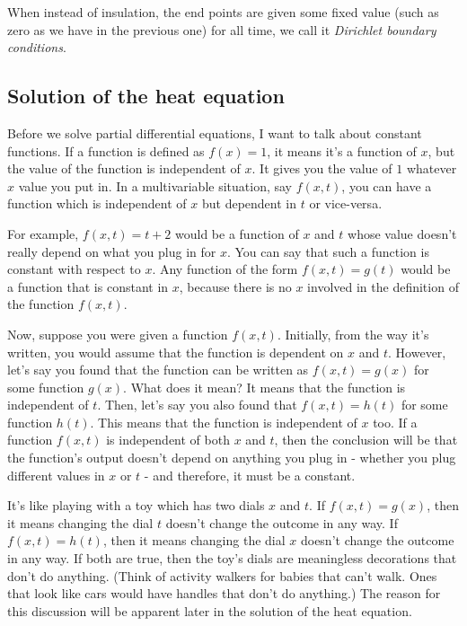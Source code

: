 \documentclass[12pt]{report}
\begin{document}
When instead of insulation, the end points are given some fixed value (such as zero as we have in the previous one) for all time, we call it \textit{Dirichlet boundary conditions}.


\subsection*{Solution of the heat equation}

Before we solve partial differential equations, I want to talk about constant functions. If a function is defined as $f(x)=1$, it means it's a function of $x$, but the value of the function is independent of $x$. It gives you the value of $1$ whatever $x$ value you put in. In a multivariable situation, say $f(x,t)$, you can have a function which is independent of $x$ but dependent in $t$ or vice-versa. 

For example, $f(x,t)=t+2$ would be a function of $x$ and $t$ whose value doesn't really depend on what you plug in for $x$. You can say that such a function is constant with respect to $x$. Any function of the form $f(x,t)=g(t)$ would be a function that is constant in $x$, because there is no $x$ involved in the definition of the function $f(x,t)$.

Now, suppose you were given a function $f(x,t)$. Initially, from the way it's written, you would assume that the function is dependent on $x$ and $t$. However, let's say you found that the function can be written as $f(x,t)=g(x)$ for some function $g(x)$. What does it mean? It means that the function is independent of $t$. Then, let's say you also found that $f(x,t)=h(t)$ for some function $h(t)$. This means that the function is independent of $x$ too. If a function $f(x,t)$ is independent of both $x$ and $t$, then the conclusion will be that the function's output doesn't depend on anything you plug in - whether you plug different values in $x$ or $t$ - and therefore, it must be a constant.

It's like playing with a toy which has two dials $x$ and $t$. If  $f(x,t)=g(x)$, then it means changing the dial $t$ doesn't change the outcome in any way. If $f(x,t)=h(t)$, then it means changing the dial $x$ doesn't change the outcome in any way. If both are true, then the toy's dials are meaningless decorations that don't do anything. (Think of activity walkers for babies that can't walk. Ones that look like cars would have handles that don't do anything.)
The reason for this discussion will be apparent later in the solution of the heat equation.
\end{document}
